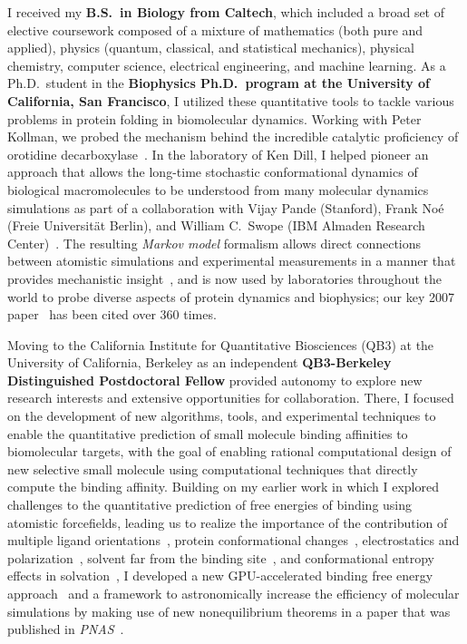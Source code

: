\documentclass[10pt]{article}
\begin{document}
I received my {\bf B.S.~in Biology from Caltech}, which included a broad set of elective coursework composed of a mixture of mathematics (both pure and applied), physics (quantum, classical, and statistical mechanics), physical chemistry, computer science, electrical engineering, and machine learning.  
As a Ph.D.~student in the {\bf Biophysics Ph.D.~program at the University of California, San Francisco}, I utilized these quantitative tools to tackle various problems in protein folding in biomolecular dynamics.
Working with Peter Kollman, we probed the mechanism behind the incredible catalytic proficiency of orotidine decarboxylase~\cite{lee-chong-chodera-kollman:2001:jacs:odcase}.
In the laboratory of Ken Dill, I helped pioneer an approach that allows the long-time stochastic conformational dynamics of biological macromolecules to be understood from many molecular dynamics simulations as part of a collaboration with Vijay Pande (Stanford), Frank No\'{e} (Freie Universit\"{a}t Berlin), and William C.~Swope (IBM Almaden Research Center)~\cite{chodera:2006:mms:long-time-dynamics,chodera:jcp:2007,bacallado:2009:jcp:detailed-balance-constraint,temperature-dependent-markov-models,noe:pnas:2011:dynamical-fingerprints,noe:jcp:2011:msm-review}.
The resulting \emph{Markov model} formalism allows direct connections between atomistic simulations and experimental measurements in a manner that provides mechanistic insight~\cite{chodera:2006:mms:long-time-dynamics,chodera:jcp:2007}, and is now used by laboratories throughout the world to probe diverse aspects of protein dynamics and biophysics; our key 2007 paper~\cite{chodera:jcp:2007} has been cited over 360 times.

Moving to the California Institute for Quantitative Biosciences (QB3) at the University of California, Berkeley as an independent {\bf QB3-Berkeley Distinguished Postdoctoral Fellow} provided autonomy to explore new research interests and extensive opportunities for collaboration.
There, I focused on the development of new algorithms, tools, and experimental techniques to enable the quantitative prediction of small molecule binding affinities to biomolecular targets, with the goal of enabling rational computational design of new selective small molecule using computational techniques that directly compute the binding affinity.
Building on my earlier work in which I explored challenges to the quantitative prediction of free energies of binding using atomistic forcefields, leading us to realize the importance of the contribution of multiple ligand orientations~\cite{mobley-chodera-dill:2006:jcp:orientation-restraints}, protein conformational changes~\cite{mobley-chodera-dill:2007:jctc:confine-and-release}, electrostatics and polarization~\cite{mobley:jpcb:2007:comparison-of-charge-models}, solvent far from the binding site~\cite{shirts-mobley-chodera-pande:2007:jpcb:dispersion-corrections}, and conformational entropy effects in solvation~\cite{mobley:jpcb:2008:implicit-hydration}, I developed a new GPU-accelerated binding free energy approach~\cite{wang:jcamd:2013:yank} and a framework to astronomically increase the efficiency of molecular simulations by making use of new nonequilibrium theorems in a paper that was published in \emph{PNAS}~\cite{ncmc}.
\end{document}

